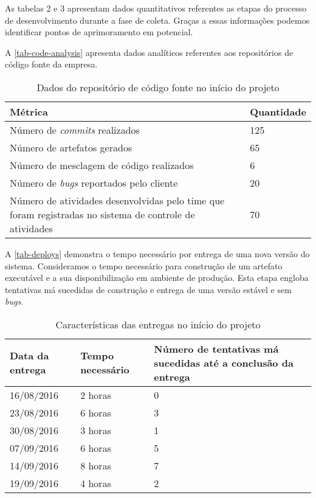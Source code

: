\documentclass[
	12pt,				%
	openright,			%
	oneside,			%
	a4paper,			%
	english,			%
	french,				%
	spanish,			%
	brazil,				%
	]{abntex2}
\begin{document}
As tabelas 2 e 3 apresentam dados quantitativos referentes as etapas do processo de desenvolvimento durante a fase de coleta. Graças a essas informações podemos identificar pontos de aprimoramento em potencial.

A \autoref{tab-code-analysis} apresenta dados analíticos referentes aos repositórios de código fonte da empresa.

\begin{table}[htb]
	\caption{Dados do repositório de código fonte no início do projeto}
	
	\label{tab-code-analysis}	
	\begin{tabular}{p{7.15cm}|p{7.10cm}}
		\textbf{Métrica} & \textbf{Quantidade}  \\
		\hline
		Número de \textit{commits} realizados & 125 \\
		\hline
		Número de artefatos gerados & 65 \\
		\hline
		Número de mesclagem de código realizados & 6 \\
		\hline
		Número de \textit{bugs} reportados pelo cliente & 20 \\
		\hline
		Número de atividades desenvolvidas pelo time que foram registradas no sistema de controle de atividades & 70 \\
	\end{tabular}
\end{table}


A \autoref{tab-deploys} demonstra o tempo necessário por entrega de uma nova versão do sistema. Consideramos o tempo necessário para construção de um artefato executável e a sua disponibilização em ambiente de produção. Esta etapa engloba tentativas má sucedidas de construção e entrega de uma versão estável e sem \textit{bugs}.

\begin{table}[htb]
	\caption{Características das entregas no início do projeto}
	
	\label{tab-deploys}	
	\begin{tabular}{p{3.85cm}|p{5.20cm}|p{5.20cm}}
		\textbf{Data da entrega} & \textbf{Tempo necessário} & \textbf{Número de tentativas má sucedidas até a conclusão da entrega}  \\
		\hline
		16/08/2016 & 2 horas & 0 \\
		\hline
		23/08/2016 & 6 horas & 3 \\
		\hline
		30/08/2016 & 3 horas & 1 \\
		\hline
		07/09/2016 & 6 horas & 5 \\
		\hline
		14/09/2016 & 8 horas & 7 \\
		\hline
		19/09/2016 & 4 horas & 2 \\
	\end{tabular}
\end{table}
\end{document}
